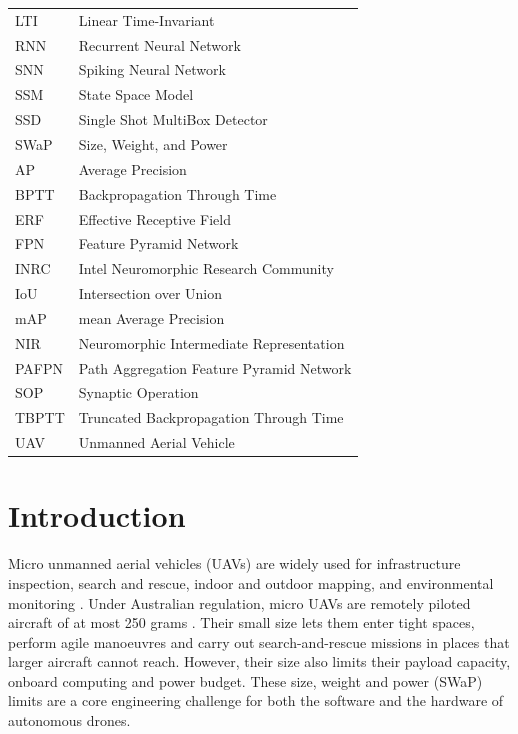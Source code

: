 \documentclass[11pt, a4paper]{report}
\newcounter{frontmatterpages}
\begin{document}
\begin{tabular}{ll}
LTI & Linear Time-Invariant \\
RNN & Recurrent Neural Network \\
SNN & Spiking Neural Network \\
SSM & State Space Model \\
SSD & Single Shot MultiBox Detector \\
SWaP & Size, Weight, and Power \\
AP & Average Precision \\
BPTT & Backpropagation Through Time \\
ERF & Effective Receptive Field \\
FPN & Feature Pyramid Network \\
INRC & Intel Neuromorphic Research Community \\
IoU & Intersection over Union \\
mAP & mean Average Precision \\
NIR & Neuromorphic Intermediate Representation \\
PAFPN & Path Aggregation Feature Pyramid Network \\
SOP & Synaptic Operation \\
TBPTT & Truncated Backpropagation Through Time \\
UAV & Unmanned Aerial Vehicle \\
\end{tabular}

\clearpage
\setcounter{frontmatterpages}{\value{page}}

\chapter{Introduction}
\label{ch:intro}
Micro unmanned aerial vehicles (UAVs) are widely used for infrastructure inspection, search and rescue, indoor and outdoor mapping, and environmental monitoring \cite{floreano2015science}. Under Australian regulation, micro UAVs are remotely piloted aircraft of at most 250 grams \cite{casa2021part101}. Their small size lets them enter tight spaces, perform agile manoeuvres and carry out search-and-rescue missions in places that larger aircraft cannot reach. However, their size also limits their payload capacity, onboard computing and power budget. These size, weight and power (SWaP) limits are a core engineering challenge for both the software and the hardware of autonomous drones.
\end{document}
